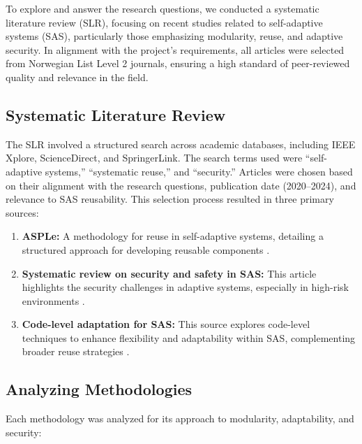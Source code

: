 \documentclass[a4paper,10pt]{article}
\begin{document}
To explore and answer the research questions, we conducted a systematic literature review (SLR), focusing on recent studies related to self-adaptive systems (SAS), particularly those emphasizing modularity, reuse, and adaptive security. In alignment with the project’s requirements, all articles were selected from Norwegian List Level 2 journals, ensuring a high standard of peer-reviewed quality and relevance in the field.

\subsection{Systematic Literature Review}

The SLR involved a structured search across academic databases, including IEEE Xplore, ScienceDirect, and SpringerLink. The search terms used were “self-adaptive systems,” “systematic reuse,” and “security.” Articles were chosen based on their alignment with the research questions, publication date (2020–2024), and relevance to SAS reusability. This selection process resulted in three primary sources:

\begin{enumerate}
    \item \textbf{ASPLe:} A methodology for reuse in self-adaptive systems, detailing a structured approach for developing reusable components \cite{Nadeem2020}.
    
    \item \textbf{Systematic review on security and safety in SAS:} This article highlights the security challenges in adaptive systems, especially in high-risk environments \cite{Pekaric2023}.
    
    \item \textbf{Code-level adaptation for SAS:} This source explores code-level techniques to enhance flexibility and adaptability within SAS, complementing broader reuse strategies \cite{Korra2022}.
\end{enumerate}

\subsection{Analyzing Methodologies}

Each methodology was analyzed for its approach to modularity, adaptability, and security:
\end{document}
